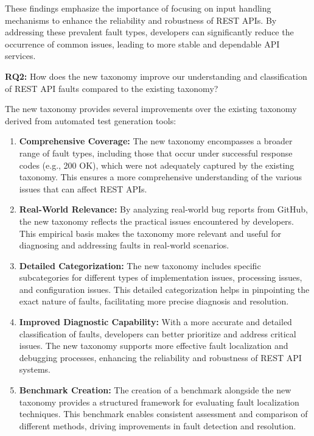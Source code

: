 \documentclass[conference]{IEEEtran}
\begin{document}
\begin{tcolorbox}[colback=gray!10, colframe=gray!80, title=RQ1]

These findings emphasize the importance of focusing on input handling mechanisms to enhance the reliability and robustness of REST APIs. By addressing these prevalent fault types, developers can significantly reduce the occurrence of common issues, leading to more stable and dependable API services.

\end{tcolorbox}


\textbf{RQ2:} How does the new taxonomy improve our understanding and classification of REST API faults compared to the existing taxonomy?


The new taxonomy provides several improvements over the existing taxonomy derived from automated test generation tools:

\begin{enumerate}
    \item \textbf{Comprehensive Coverage:} The new taxonomy encompasses a broader range of fault types, including those that occur under successful response codes (e.g., 200 OK), which were not adequately captured by the existing taxonomy. This ensures a more comprehensive understanding of the various issues that can affect REST APIs.
    \item \textbf{Real-World Relevance:} By analyzing real-world bug reports from GitHub, the new taxonomy reflects the practical issues encountered by developers. This empirical basis makes the taxonomy more relevant and useful for diagnosing and addressing faults in real-world scenarios.
    \item \textbf{Detailed Categorization:} The new taxonomy includes specific subcategories for different types of implementation issues, processing issues, and configuration issues. This detailed categorization helps in pinpointing the exact nature of faults, facilitating more precise diagnosis and resolution.
    \item \textbf{Improved Diagnostic Capability:} With a more accurate and detailed classification of faults, developers can better prioritize and address critical issues. The new taxonomy supports more effective fault localization and debugging processes, enhancing the reliability and robustness of REST API systems.
    \item \textbf{Benchmark Creation:} The creation of a benchmark alongside the new taxonomy provides a structured framework for evaluating fault localization techniques. This benchmark enables consistent assessment and comparison of different methods, driving improvements in fault detection and resolution.
\end{enumerate}
\end{document}
